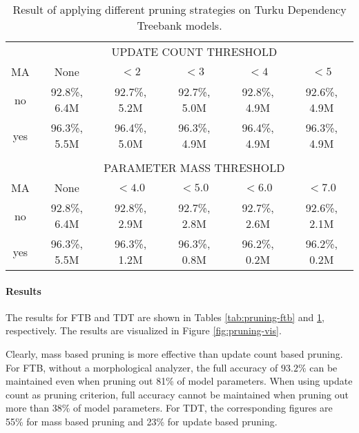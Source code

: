 \begin{table}[htb!]
\begin{center}
\begin{tabular}{c|c|c|c|c|c}
\multicolumn{1}{c}{}                       & \multicolumn{5}{c}{{\small\uppercase{Update Count Threshold}}}\\
\noalign{\smallskip}
\noalign{\smallskip}
\hline
MA                     & None            & $< 2$        & $< 3$        & $< 4$        & $< 5$       \\
\hline
no                     & 92.8\%, 6.4M    & 92.7\%, 5.2M & 92.7\%, 5.0M & 92.8\%, 4.9M & 92.6\%, 4.9M \\
yes                    & 96.3\%, 5.5M    & 96.4\%, 5.0M & 96.3\%, 4.9M & 96.4\%, 4.9M & 96.3\%, 4.9M \\
\multicolumn{6}{c}{ }\\%
\multicolumn{1}{c}{}     & \multicolumn{5}{c}{{\small\uppercase{Parameter Mass Threshold}}}\\
\noalign{\smallskip}
\hline
MA                     & None           & $< 4.0$        & $< 5.0$      & $< 6.0$      & $< 7.0$     \\
\hline
no                     & 92.8\%, 6.4M   & 92.8\%, 2.9M   & 92.7\%, 2.8M & 92.7\%, 2.6M & 92.6\%, 2.1M \\
yes                    & 96.3\%, 5.5M   & 96.3\%, 1.2M   & 96.3\%, 0.8M & 96.2\%, 0.2M & 96.2\%, 0.2M \\
\end{tabular}
\caption{Result of applying different pruning strategies on Turku Dependency Treebank models.}\label{tab:pruning-tdt}
\end{center}
\end{table}


\paragraph{Results} The results for FTB and TDT are shown in Tables
\ref{tab:pruning-ftb} and \ref{tab:pruning-tdt}, respectively. The
results are visualized in Figure \ref{fig:pruning-vis}.

Clearly, mass based pruning is more effective than update count based
pruning. For FTB, without a morphological analyzer, the full accuracy
of $93.2\%$ can be maintained even when pruning out 81\% of model
parameters. When using update count as pruning criterion, full
accuracy cannot be maintained when pruning out more than 38\% of model
parameters. For TDT, the corresponding figures are 55\% for mass based
pruning and 23\% for update based pruning.

